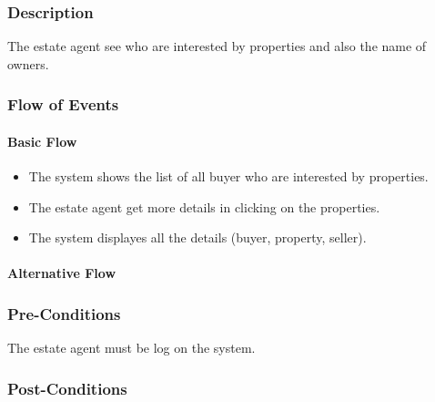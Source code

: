 \documentclass[a4paper,12pt]{article}
\begin{document}
\subsubsection{Description}
The estate agent see who are interested by properties and also the name of owners.
\subsubsection{Flow of Events}
\paragraph{Basic Flow}
\begin{itemize}
\item The system shows the list of all buyer who are interested by properties.
\item The estate agent get more details in clicking on the properties.
\item The system displayes all the details (buyer, property, seller).
\end{itemize}
\paragraph{Alternative Flow}
\begin{itemize}
\end{itemize}
\subsubsection{Pre-Conditions}
The estate agent must be log on the system.
\subsubsection{Post-Conditions}
\end{document}
